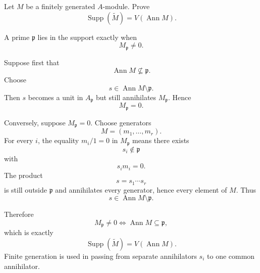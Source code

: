 \begin{problem}\label{prob:vi33-04}
Let \(M\) be a finitely generated \(A\)-module. Prove
\[
\operatorname{Supp}(\widetilde M)=V(\operatorname{Ann}M).
\]
\end{problem}

\ifdefined\FullProblemDossiers
\begin{solution}
A prime \(\mathfrak p\) lies in the support exactly when
\[
M_{\mathfrak p}\ne0.
\]

Suppose first that
\[
\operatorname{Ann}M\not\subseteq\mathfrak p.
\]
Choose
\[
s\in\operatorname{Ann}M\setminus\mathfrak p.
\]
Then \(s\) becomes a unit in \(A_{\mathfrak p}\) but still annihilates \(M_{\mathfrak p}\). Hence
\[
M_{\mathfrak p}=0.
\]

Conversely, suppose \(M_{\mathfrak p}=0\). Choose generators
\[
M=(m_1,\ldots,m_r).
\]
For every \(i\), the equality \(m_i/1=0\) in \(M_{\mathfrak p}\) means there exists
\[
s_i\notin\mathfrak p
\]
with
\[
s_i m_i=0.
\]
The product
\[
s=s_1\cdots s_r
\]
is still outside \(\mathfrak p\) and annihilates every generator, hence every element of \(M\). Thus
\[
s\in\operatorname{Ann}M\setminus\mathfrak p.
\]

Therefore
\[
M_{\mathfrak p}\ne0
\iff
\operatorname{Ann}M\subseteq\mathfrak p,
\]
which is exactly
\[
\boxed{\operatorname{Supp}(\widetilde M)=V(\operatorname{Ann}M)}.
\]
Finite generation is used in passing from separate annihilators \(s_i\) to one common annihilator.
\end{solution}
\fi
